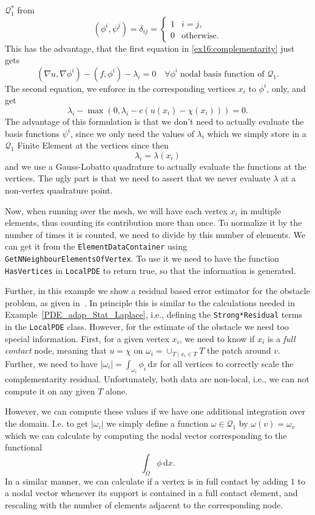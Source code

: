 $\mathcal Q_1^*$ from
\[
 (\phi^i,\psi^j) = \delta_{ij} = \begin{cases} 1 & i = j,\\ 0 &
   \text{otherwise.}
 \end{cases}
\] 
This has the advantage, that
the first equation in \eqref{ex16:complementarity} just gets
\[
  (\nabla u, \nabla \phi^i) - (f,\phi^i) - \lambda_i = 0 \quad \forall
    \phi^i \;\text{nodal basis function of $\mathcal Q_1$.}
\]
The second equation, we enforce in the corresponding vertices $x_i$ to
$\phi^i$, only, and get
\[
    \lambda_i - \max(0,\lambda_i-c(u(x_i)-\chi(x_i))) = 0.
\]
 The advantage of this formulation is that we don't need to actually
 evaluate the basis functions $\psi^i$, since we only need the values
 of $\lambda_i$ which we simply store in a $\mathcal Q_1$
 Finite Element at the vertices since then
 \[
   \lambda_i = \lambda(x_i) 
 \]
 and we use a Gauss-Lobatto quadrature to actually evaluate the
 functions at the vertices. The ugly part is that we need to assert
 that we never evaluate $\lambda$ at a non-vertex quadrature point.

 Now, when running over the mesh, we will have each vertex $x_i$ in
 multiple elements, thus counting its contribution more than once.
 To normalize it by the number of times it is counted, we need to
 divide by this number of elements. We can get it from the
 \texttt{ElementDataContainer} using
 \texttt{GetNNeighbourElementsOfVertex}.
 To use it we need to have the function \texttt{HasVertices} in
 \texttt{LocalPDE} to return true, so that the information is generated.

 Further, in this example we show a residual based error estimator
 for the obstacle problem, as given in~\cite{Walloth:2017}. In
 principle this is similar to the calculations needed in
 Example~\ref{PDE_adap_Stat_Laplace}, i.e., defining the
 \texttt{Strong*Residual} terms in the \texttt{LocalPDE} class.
 However, for the estimate of the obstacle we need too special
 information. First, for a given vertex $x_i$, we need to know if
 $x_i$ is a \textit{full contact} node, meaning that $u = \chi$ on
 $\omega_i = \cup_{T \mid x_i \in T} T$ the patch around $v$. Further,
 we need to have $|\omega_i| = \int_{\omega_i} \phi_i\,\mathrm{d}x$ for all
 vertices to correctly scale the complementarity residual.
 Unfortunately, both data are non-local, i.e., we can not compute it
 on any given $T$ alone.

 However, we can compute these values if we have one additional
 integration over the domain. I.e. to get $|\omega_i|$ we simply
 define a function $\omega \in \mathcal Q_1$ by $\omega(v) = \omega_v$
 which we can calculate by computing the nodal vector corresponding to
 the functional
 \[
   \int_\Omega \phi\,\mathrm{d}x.
 \]
 In a similar manner, we can calculate if a vertex is in full contact
 by adding $1$ to a nodal vector whenever its support is contained in
 a full contact element, and rescaling with the number of elements
 adjacent to the corresponding node.

